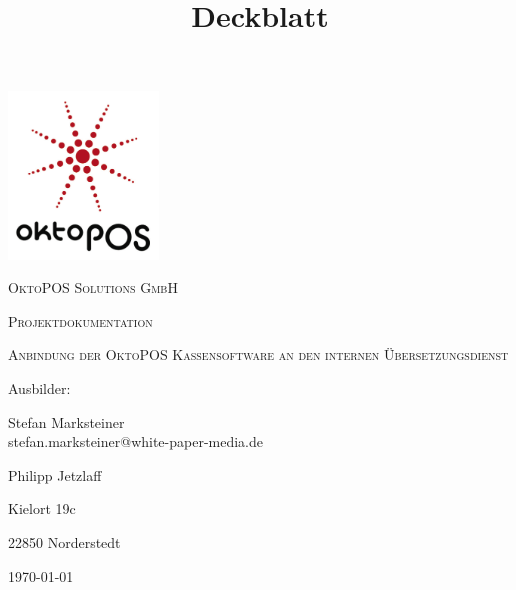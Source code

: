 \documentclass[11pt]{article}
\title{Deckblatt}
\begin{document}
\begin{titlepage}
	\centering
	\includegraphics[width=0.30\textwidth]{OktoPOS.png}\par\vspace{0.5cm}
	{\scshape\LARGE OktoPOS Solutions GmbH \par}
	\vspace{1cm}
	\vspace{1.5cm}
    {\scshape\Large Projektdokumentation \par}
    \vspace{1cm}
    {\scshape\large Anbindung der OktoPOS Kassensoftware an den internen Übersetzungsdienst\par}
    \vspace{2cm}
\flushleft
    Ausbilder:\par
    Stefan Marksteiner\\
    stefan.marksteiner@white-paper-media.de
	\vspace{3cm}
	{\Large\itshape \par}
	\vfill
    \par
    Philipp Jetzlaff \par
    Kielort 19c \par
    22850 Norderstedt\par
    \vspace{3cm}
	{\large \today\par}
    

	\vfill
	
\end{titlepage}
\end{document}
